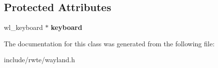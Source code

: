 \subsection*{Protected Attributes}
\begin{DoxyCompactItemize}
\item 
\mbox{\label{classwayland_1_1Keyboard_adc71727e892c52650eb4ba8e5f0fe3aa}} 
wl\+\_\+keyboard $\ast$ {\bfseries keyboard}
\end{DoxyCompactItemize}


The documentation for this class was generated from the following file\+:\begin{DoxyCompactItemize}
\item 
include/rwte/wayland.\+h\end{DoxyCompactItemize}

